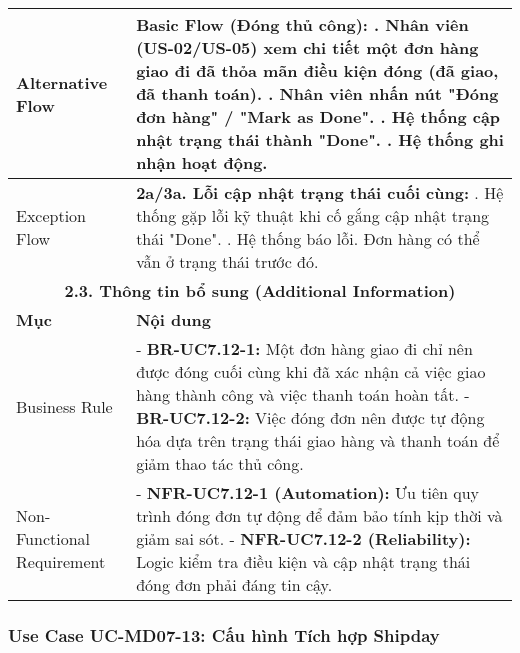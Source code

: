 \begin{longtable}{|m{4cm}|p{11cm}|}
\hline
Alternative Flow & \textbf{Basic Flow (Đóng thủ công):} \newline    1. Nhân viên (US-02/US-05) xem chi tiết một đơn hàng giao đi đã thỏa mãn điều kiện đóng (đã giao, đã thanh toán). \newline    2. Nhân viên nhấn nút "Đóng đơn hàng" / "Mark as Done". \newline    3. Hệ thống cập nhật trạng thái thành "Done". \newline    4. Hệ thống ghi nhận hoạt động. \\
\hline
Exception Flow & \textbf{2a/3a. Lỗi cập nhật trạng thái cuối cùng:} \newline    1. Hệ thống gặp lỗi kỹ thuật khi cố gắng cập nhật trạng thái "Done". \newline    2. Hệ thống báo lỗi. Đơn hàng có thể vẫn ở trạng thái trước đó. \\
\hline
\multicolumn{2}{|c|}{\textbf{2.3. Thông tin bổ sung (Additional Information)}} \\
\hline
\textbf{Mục} & \textbf{Nội dung} \\
\hline
Business Rule & - \textbf{BR-UC7.12-1:} Một đơn hàng giao đi chỉ nên được đóng cuối cùng khi đã xác nhận cả việc giao hàng thành công và việc thanh toán hoàn tất. \newline - \textbf{BR-UC7.12-2:} Việc đóng đơn nên được tự động hóa dựa trên trạng thái giao hàng và thanh toán để giảm thao tác thủ công. \\
\hline
Non-Functional Requirement & - \textbf{NFR-UC7.12-1 (Automation):} Ưu tiên quy trình đóng đơn tự động để đảm bảo tính kịp thời và giảm sai sót. \newline - \textbf{NFR-UC7.12-2 (Reliability):} Logic kiểm tra điều kiện và cập nhật trạng thái đóng đơn phải đáng tin cậy. \\
\hline
\end{longtable}

\subsubsection{Use Case UC-MD07-13: Cấu hình Tích hợp Shipday}

